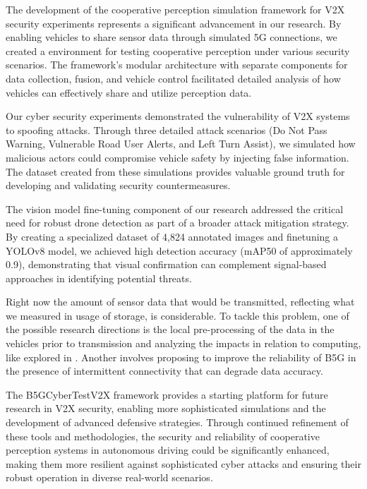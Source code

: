 The development of the cooperative perception simulation framework for V2X security experiments represents a significant advancement in our research. By enabling vehicles to share sensor data through simulated 5G connections, we created a environment for testing cooperative perception under various security scenarios. The framework's modular architecture with separate components for data collection, fusion, and vehicle control facilitated detailed analysis of how vehicles can effectively share and utilize perception data.

Our cyber security experiments demonstrated the vulnerability of V2X systems to spoofing attacks. Through three detailed attack scenarios (Do Not Pass Warning, Vulnerable Road User Alerts, and Left Turn Assist), we simulated how malicious actors could compromise vehicle safety by injecting false information. The dataset created from these simulations provides valuable ground truth for developing and validating security countermeasures.

The vision model fine-tuning component of our research addressed the critical need for robust drone detection as part of a broader attack mitigation strategy. By creating a specialized dataset of 4,824 annotated images and finetuning a YOLOv8 model, we achieved high detection accuracy (mAP50 of approximately 0.9), demonstrating that visual confirmation can complement signal-based approaches in identifying potential threats.

Right now the amount of sensor data that would be transmitted, reflecting what we measured in usage of storage, is considerable. To tackle this problem, one of the possible research directions is the local pre-processing of the data in the vehicles prior to transmission and analyzing the impacts in relation to computing, like explored in \cite{THANDAVARAYAN2023103655}. Another involves proposing to improve the reliability of B5G in the presence of intermittent connectivity that can degrade data accuracy.

The B5GCyberTestV2X framework provides a starting platform for future research in V2X security, enabling more sophisticated simulations and the development of advanced defensive strategies. Through continued refinement of these tools and methodologies, the security and reliability of cooperative perception systems in autonomous driving could be significantly enhanced, making them more resilient against sophisticated cyber attacks and ensuring their robust operation in diverse real-world scenarios.

